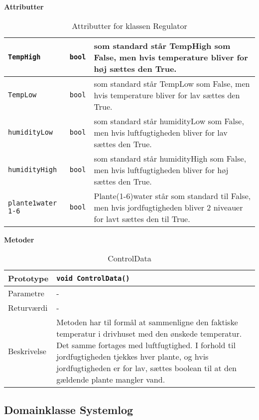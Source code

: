 \textbf{Attributter}

\begin{table}[h]
\begin{tabularx}{\textwidth}{| >{\raggedright\arraybackslash}X | >{\raggedright\arraybackslash}X | >{\raggedright\arraybackslash}p{10 cm} |} \hline
\texttt{TempHigh} & \texttt{bool} & som standard står TempHigh som False, men hvis temperature bliver for høj sættes den True. \\\hline
\texttt{TempLow} & \texttt{bool} & som standard står TempLow som False, men hvis temperature bliver for lav sættes den True. \\\hline
\texttt{humidityLow} & \texttt{bool} & som standard står humidityLow som False, men hvis luftfugtigheden bliver for lav sættes den True. \\\hline
\texttt{humidityHigh} & \texttt{bool} & som standard står humidityHigh som False, men hvis luftfugtigheden bliver for høj sættes den True.\\\hline
\texttt{plante1water 1-6} & \texttt{bool} & Plante(1-6)water står som standard til False, men hvis jordfugtigheden bliver 2 niveauer for lavt sættes den til True.\\\hline
\end{tabularx}
\caption{Attributter for klassen Regulator}
\label{table:Regulator_attributter}
\end{table}

\textbf{Metoder}

\begin{table}[h]
\begin{tabularx}{\textwidth}{| >{\raggedright\arraybackslash}p{2.5 cm} | >{\raggedright\arraybackslash}X |} \hline
Prototype & \texttt{void ControlData()} \\\hline
Parametre & - \\\hline
Returværdi & - \\\hline
Beskrivelse & Metoden har til formål at sammenligne den faktiske temperatur i drivhuset med den ønskede temperatur. Det samme fortages med luftfugtighed. I forhold til jordfugtigheden tjekkes hver plante, og hvis jordfugtigheden er for lav, sættes boolean til at den gældende plante mangler vand. \\\hline
\end{tabularx}
\caption{ControlData}
\label{table:ControlData}
\end{table}

\clearpage

\subsection{Domainklasse Systemlog}


